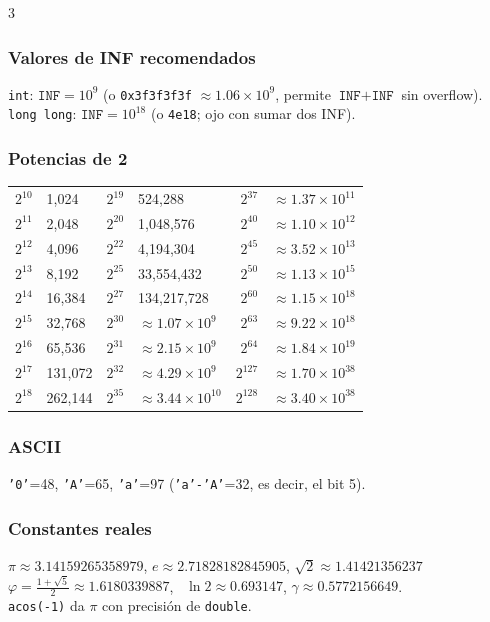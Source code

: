 \documentclass[8pt, spanish, mexico, letterpaper]{extarticle}
\newcommand{\<}{<}
\begin{document}
\begin{multicols*}{3}
\subsubsection*{Valores de INF recomendados}
\texttt{int}: \(\texttt{INF}=10^9\) (o \texttt{0x3f3f3f3f} $\approx 1.06\times10^9$, permite $\texttt{INF}+\texttt{INF}$ sin overflow). \\
\texttt{long long}: \(\texttt{INF}=10^{18}\) (o \texttt{4e18}; ojo con sumar dos INF).

\subsubsection*{Potencias de 2}
\begin{tabular}{rl|rl|rl}
\(2^{10}\) & 1,024 & \(2^{19}\) & 524,288 & \(2^{37}\) & \(\approx 1.37\times10^{11}\) \\
\(2^{11}\) & 2,048 & \(2^{20}\) & 1,048,576 & \(2^{40}\) & \(\approx 1.10\times10^{12}\) \\
\(2^{12}\) & 4,096 & \(2^{22}\) & 4,194,304 & \(2^{45}\) & \(\approx 3.52\times10^{13}\) \\
\(2^{13}\) & 8,192 & \(2^{25}\) & 33,554,432 & \(2^{50}\) & \(\approx 1.13\times10^{15}\) \\
\(2^{14}\) & 16,384 & \(2^{27}\) & 134,217,728 & \(2^{60}\) & \(\approx 1.15\times10^{18}\) \\
\(2^{15}\) & 32,768 & \(2^{30}\) & \(\approx 1.07\times10^9\) & \(2^{63}\) & \(\approx 9.22\times10^{18}\) \\
\(2^{16}\) & 65,536 & \(2^{31}\) & \(\approx 2.15\times10^9\) & \(2^{64}\) & \(\approx 1.84\times10^{19}\) \\
\(2^{17}\) & 131,072 & \(2^{32}\) & \(\approx 4.29\times10^9\) & \(2^{127}\) & \(\approx 1.70\times10^{38}\) \\
\(2^{18}\) & 262,144 & \(2^{35}\) & \(\approx 3.44\times10^{10}\) & \(2^{128}\) & \(\approx 3.40\times10^{38}\) \\
\end{tabular}

\subsubsection*{ASCII}
\texttt{'0'}=48, \texttt{'A'}=65, \texttt{'a'}=97 \quad (\texttt{'a'-'A'}=32, es decir, el bit 5).
\subsubsection*{Constantes reales}
\(\pi \approx 3.14159265358979\),  \(e \approx 2.71828182845905\), \(\sqrt2 \approx 1.41421356237\) \\
\(\varphi=\frac{1+\sqrt5}{2}\approx 1.6180339887\), \  \(\ln2\approx0.693147\), \quad \(\gamma\approx0.5772156649\). \\
\texttt{acos(-1)} da $\pi$ con precisión de \texttt{double}.


\end{multicols*}
\end{document}
